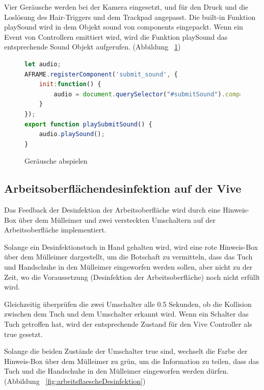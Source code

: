  Vier Geräusche werden bei der Kamera eingesetzt, und für den Druck und die Loslösung des Hair-Triggers und dem Trackpad angepasst. Die built-in Funktion {\selectfont playSound} wird in dem Objekt {\selectfont sound} von {\selectfont components} eingepackt. Wenn ein Event von Controllern emittiert wird, wird die Funktion {\selectfont playSound} das entsprechende Sound Objekt aufgerufen. (Abbildung ~\ref{fig:submitSound})
 
\begin{figure}[ht]
\vspace*{1em}
\centering
\caption[Geräusche abspielen]{Geräusche abspielen}
\begin{lstlisting}[language=JavaScript, style=htmlcssjs]
let audio;
AFRAME.registerComponent('submit_sound', {
    init:function() {
        audio = document.querySelector("#submitSound").components.sound;
    }
});
export function playSubmitSound() {
    audio.playSound();
}
\end{lstlisting}
\label{fig:submitSound} 
\end{figure}
 
 \subsection{Arbeitsoberflächendesinfektion auf der Vive}
 Das Feedback der Desinfektion der Arbeitsoberfläche wird durch eine Hinweis-Box über dem Mülleimer und zwei versteckten Umschaltern auf der Arbeitsoberfläche implementiert.
 
 Solange ein Desinfektionstuch in Hand gehalten wird, wird eine rote Hinweis-Box über dem Mülleimer dargestellt, um die Botschaft zu vermitteln, dass das Tuch und Handschuhe in den Mülleimer eingeworfen werden sollen, aber nicht zu der Zeit, wo die Voraussetzung (Desinfektion der Arbeitsoberfläche) noch nicht erfüllt wird.
 
 Gleichzeitig überprüfen die zwei Umschalter alle 0.5 Sekunden, ob die Kollision zwischen dem Tuch und dem Umschalter erkannt wird. Wenn ein Schalter das Tuch getroffen hat, wird der entsprechende Zustand für den Vive Controller als {\selectfont true} gesetzt.
 
 Solange die beiden Zustände der Umschalter {\selectfont true} sind, wechselt die Farbe der Hinweis-Box über dem Mülleimer zu grün, um die Information zu teilen, dass das Tuch und die Handschuhe in den Mülleimer eingeworfen werden dürfen. (Abbildung ~\ref{fig:arbeitsflaescheDesinfektion})
 
